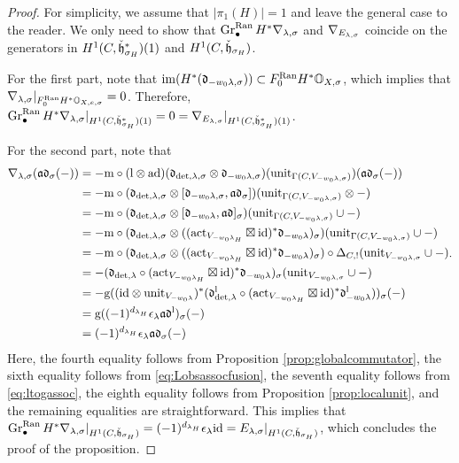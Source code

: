 \documentclass[reqno]{amsart}
\numberwithin{equation}{section}
\numberwithin{equation}{section}
\begin{document}
\begin{proof}
    For simplicity, we assume that $|\pi_1(H)|=1$ and leave the general case to the reader. We only need to show that $\operatorname{Gr}^{\mathrm{Ran}}_{\bullet}H^*\nabla_{\lambda,\sigma}$ and $\nabla_{E_{\lambda,\sigma}}$ coincide on the generators in $H^1(C,\check{\mathfrak{h}}_{\sigma_H}^*)(1)$ and $H^1(C,\check{\mathfrak{h}}_{\sigma_H})$.

    For the first part, note that $\mathrm{im}(H^*(\mathfrak{d}_{-w_0\lambda,\sigma}))\subset F_0^{\mathrm{Ran}}H^*\mathbb{O}_{X,\sigma}$, which implies that $\nabla_{\lambda,\sigma}|_{F_0^{\mathrm{Ran}}H^*\mathbb{O}_{X,e,\sigma}}=0$. Therefore, $\operatorname{Gr}^{\mathrm{Ran}}_{\bullet}H^*\nabla_{\lambda,\sigma}|_{H^1(C,\check{\mathfrak{h}}_{\sigma_H}^*)(1)}=0=\nabla_{E_{\lambda,\sigma}}|_{H^1(C,\check{\mathfrak{h}}_{\sigma_H}^*)(1)}$. 

    For the second part, note that  \[\begin{split}
    \nabla_{\lambda,\sigma}(\mathfrak{a}\mathfrak{d}_{\sigma}(-)) & = -\mathrm{m}\circ (\mathrm{l}\otimes\mathrm{ad})(\mathfrak{d}_{\det,\lambda,\sigma}\otimes \mathfrak{d}_{-w_0\lambda,\sigma}) (\mathrm{unit}_{\Gamma(C,V_{-w_0\lambda,\sigma})})(\mathfrak{a}\mathfrak{d}_{\sigma}(-)) \\
    & = - \mathrm{m}\circ (\mathfrak{d}_{\det,\lambda,\sigma}\otimes [\mathfrak{d}_{-w_0\lambda,\sigma},\mathfrak{a}\mathfrak{d}_{\sigma}]) (\mathrm{unit}_{\Gamma(C,V_{-w_0\lambda,\sigma})}\otimes -) \\
    & = - \mathrm{m}\circ (\mathfrak{d}_{\det,\lambda,\sigma}\otimes [\mathfrak{d}_{-w_0\lambda},\mathfrak{a}\mathfrak{d}]_{\sigma}) (\mathrm{unit}_{\Gamma(C,V_{-w_0\lambda,\sigma})}\cup -) \\
    & = - \mathrm{m}\circ (\mathfrak{d}_{\det,\lambda,\sigma}\otimes ((\mathrm{act}_{V_{-w_0\lambda_H}}\boxtimes \mathrm{id})^*\mathfrak{d}_{-w_0\lambda})_{\sigma}) (\mathrm{unit}_{\Gamma(C,V_{-w_0\lambda,\sigma})}\cup -) \\
    & = - \mathrm{m}\circ (\mathfrak{d}_{\det,\lambda,\sigma}\otimes ((\mathrm{act}_{V_{-w_0\lambda_H}}\boxtimes \mathrm{id})^*\mathfrak{d}_{-w_0\lambda})_{\sigma})\circ \Delta_{C,!}(\mathrm{unit}_{V_{-w_0\lambda,\sigma}}\cup -) \\
    & = - (\mathfrak{d}_{\det,\lambda}\circ (\mathrm{act}_{V_{-w_0\lambda_H}}\boxtimes \mathrm{id})^*\mathfrak{d}_{-w_0\lambda})_{\sigma} (\mathrm{unit}_{V_{-w_0\lambda,\sigma}}\cup -) \\
    & = - \mathrm{g} ((\mathrm{id}\otimes\mathrm{unit}_{V_{-w_0\lambda}})^*(\mathfrak{d}_{\det,\lambda}^{\mathrm{l}}\circ (\mathrm{act}_{V_{-w_0\lambda_H}}\boxtimes \mathrm{id})^*\mathfrak{d}_{-w_0\lambda}^{\mathrm{l}}))_{\sigma} (-) \\
    & = \mathrm{g} ((-1)^{d_{\lambda_H} }\epsilon_{\lambda}\mathfrak{a}\mathfrak{d}^{\mathrm{l}})_{\sigma} (-) \\
    & = (-1)^{d_{\lambda_H} }\epsilon_{\lambda}\mathfrak{a}\mathfrak{d}_{\sigma}(-)
    \end{split}.\]
    Here, the fourth equality follows from Proposition \ref{prop:globalcommutator}, the sixth equality follows from \eqref{eq:Lobsassocfusion}, the seventh equality follows from \eqref{eq:ltogassoc}, the eighth equality follows from Proposition \ref{prop:localunit}, and the remaining equalities are straightforward. This implies that $\operatorname{Gr}^{\mathrm{Ran}}_{\bullet}H^*\nabla_{\lambda,\sigma}|_{H^1(C,\check{\mathfrak{h}}_{\sigma_H})}=(-1)^{d_{\lambda_H} }\epsilon_{\lambda}\mathrm{id}=E_{\lambda,\sigma}|_{H^1(C,\check{\mathfrak{h}}_{\sigma_H})}$, which concludes the proof of the proposition.
\end{proof}
\end{document}
